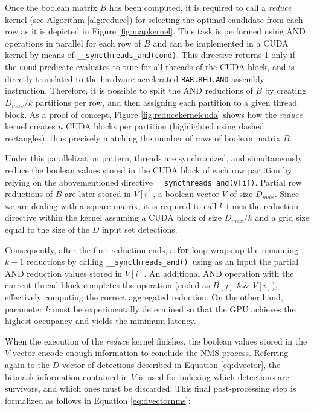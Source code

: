 Once the boolean matrix $B$ has been computed, it is required to call a \emph{reduce} kernel (see Algorithm \ref{alg:reduce}) for 
selecting the optimal candidate from each row as it is depicted in Figure \ref{fig:mapkernel}. This task is performed using 
AND operations in parallel for each row of $B$ and can be implemented in a CUDA kernel by means of \small\texttt{\_\_syncthreads\_and(cond)}. \normalsize This 
directive returns 1 only if the \texttt{cond} predicate evaluates to true for all threads of the 
CUDA block, and is directly translated to the hardware-accelerated \small\texttt{BAR.RED.AND} \normalsize 
assembly instruction. Therefore, it is possible to split the AND reductions of $B$ by creating 
$D_{max} / k$ partitions per row, and then assigning each partition to a given thread block. As a proof of concept, Figure \ref{fig:reducekernelcuda} 
shows how the \emph{reduce} kernel creates $n$ CUDA blocks per partition (highlighted using dashed rectangles), thus precisely matching the 
number of rows of boolean matrix $B$.

Under this parallelization pattern, threads are synchronized, and simultaneously reduce the boolean values 
stored in the CUDA block of each row partition by relying on the abovementioned directive \small\texttt{\_\_syncthreads\_and(V[i])}\normalsize. 
Partial row reductions of $B$ are later stored in $V[i]$, a boolean vector $V$ of size $D_{max}$. Since we are dealing with a square matrix, it is 
required to call $k$ times the reduction directive within the kernel assuming a CUDA block of size $D_{max} / k$ and a grid size 
equal to the size of the $D$ input set detections.

Consequently, after the first reduction ends, a \textbf{for} loop wraps up the remaining $k-1$ reductions by 
calling \small\texttt{\_\_syncthreads\_and() }\normalsize using as an input the partial AND reduction values 
stored in $V[i]$. An additional AND operation with the current thread block completes the operation (coded as $B[j]$ \&\& $V[i]$), 
effectively computing the correct aggregated reduction. On the other hand, parameter $k$ must be experimentally determined so that 
the GPU achieves the highest occupancy and yields the minimum latency.

When the execution of the \emph{reduce} kernel finishes, the boolean values stored in the $V$ vector encode enough information to conclude  
the NMS process. Referring again to the $D$ vector of detections described in Equation \ref{eq:dvector}, the bitmask information 
contained in $V$ is used for indexing which detections are survivors, and which ones must be discarded. This final post-processing step 
is formalized as follows in Equation \ref{eq:dvectornms}:

